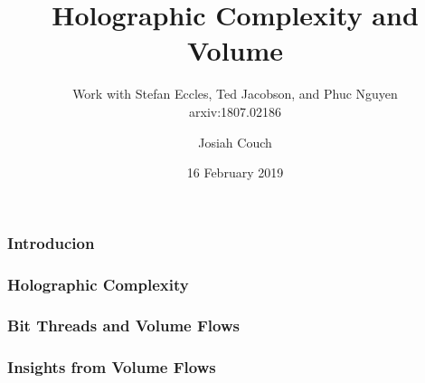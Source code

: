 \documentclass[8pt,aspectratio=169]{beamer}
\title{Holographic Complexity and Volume}
\subtitle{Work with Stefan Eccles, Ted Jacobson, and Phuc Nguyen\\ arxiv:1807.02186}
\author{Josiah Couch}
\institute{University of Texas at Austin}
\date{16 February 2019}
\begin{document}
\begin{frame}
\frametitle{Introducion}


\end{frame}

\begin{frame}
\titlepage\end{frame}

\begin{frame}
\frametitle{Holographic Complexity}


\end{frame}

\begin{frame}
\frametitle{Bit Threads and Volume Flows}


\end{frame}

\begin{frame}
\frametitle{Insights from Volume Flows}


\end{frame}
\end{document}
